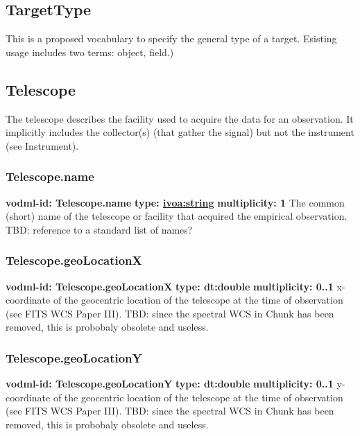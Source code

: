   \subsection{TargetType}
  \label{sect:TargetType}
    This is a proposed vocabulary to specify the general type of a target. Esisting usage includes two terms: object, field.)

  \subsection{Telescope}
  \label{sect:Telescope}
    The telescope describes the facility used to acquire the data for an observation. It implicitly includes the collector(s) (that gather the signal) but not the instrument (see Instrument).

    \subsubsection{Telescope.name}
      \textbf{vodml-id: Telescope.name} \newline
      \textbf{type: \hyperref[sect:ivoa]{ivoa:string}} \newline
      \textbf{multiplicity: 1} \newline
      The common (short) name of the telescope or facility that acquired the empirical observation. TBD: reference to a standard list of names?

    \subsubsection{Telescope.geoLocationX}
      \textbf{vodml-id: Telescope.geoLocationX} \newline
      \textbf{type: dt:double} \newline
      \textbf{multiplicity: 0..1} \newline
      x-coordinate of the geocentric location of the telescope at the time of observation (see FITS WCS Paper III). TBD: since the spectral WCS in Chunk has been removed, this is probobaly obsolete and useless.

    \subsubsection{Telescope.geoLocationY}
      \textbf{vodml-id: Telescope.geoLocationY} \newline
      \textbf{type: dt:double} \newline
      \textbf{multiplicity: 0..1} \newline
      y-coordinate of the geocentric location of the telescope at the time of observation (see FITS WCS Paper III). TBD: since the spectral WCS in Chunk has been removed, this is probobaly obsolete and useless.

